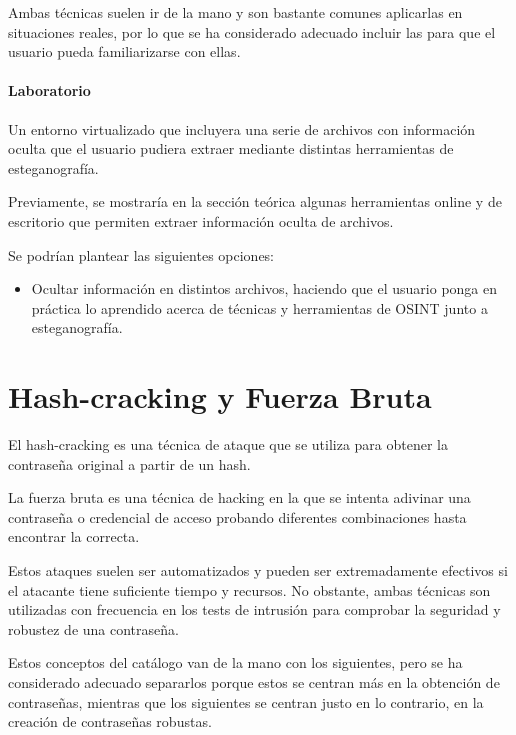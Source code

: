         Ambas técnicas suelen ir de la mano y son bastante comunes aplicarlas en situaciones reales, por lo que se ha considerado adecuado incluir las para que el usuario pueda familiarizarse con ellas.
            
        \paragraph{Laboratorio}

            Un entorno virtualizado que incluyera una serie de archivos con información oculta que el usuario pudiera extraer mediante distintas herramientas de esteganografía.

            Previamente, se mostraría en la sección teórica algunas herramientas online y de escritorio que permiten extraer información oculta de archivos.

            Se podrían plantear las siguientes opciones:
            
            \begin{itemize}
                \item Ocultar información en distintos archivos, haciendo que el usuario ponga en práctica lo aprendido acerca de técnicas y herramientas de OSINT junto a esteganografía.
            \end{itemize}

        
        \section{Hash-cracking y Fuerza Bruta}

            El hash-cracking es una técnica de ataque que se utiliza para obtener la contraseña original a partir de un hash.

            La fuerza bruta es una técnica de hacking en la que se intenta adivinar una contraseña o credencial de acceso probando diferentes combinaciones hasta encontrar la correcta.
            
            Estos ataques suelen ser automatizados y pueden ser extremadamente efectivos si el atacante tiene suficiente tiempo y recursos. No obstante, ambas técnicas son utilizadas con frecuencia en los tests de intrusión para comprobar la seguridad y robustez de una contraseña.

            Estos conceptos del catálogo van de la mano con los siguientes, pero se ha considerado adecuado separarlos porque estos se centran más en la obtención de contraseñas, mientras que los siguientes se centran justo en lo contrario, en la creación de contraseñas robustas. 

